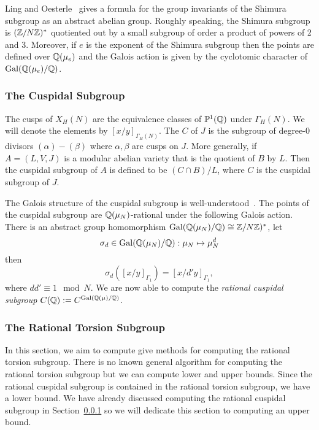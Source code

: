 \documentclass{article}
\begin{document}
Ling and Oesterle~\cite[Theorem 1,2]{MR1141458} gives a formula for the group
invariants of the Shimura subgroup as an abstract abelian group. Roughly
speaking, the Shimura subgroup is $(\mathbb{Z}/N\mathbb{Z})^*$ quotiented out by a small
subgroup of order a product of powers of 2 and 3. Moreover, if $e$ is the
exponent of the Shimura subgroup then the points are defined over $\mathbb{Q}(\mu_e)$
and the Galois action is given by the cyclotomic character of
$\operatorname{Gal}(\mathbb{Q}(\mu_e)/\mathbb{Q})$.


\subsubsection{The Cuspidal Subgroup}
\label{sec:cuspidal_subgroup}

The cusps of $X_H(N)$ are the equivalence classes of $\mathbb{P}^1(\mathbb{Q})$ under
$\Gamma_H(N)$. We will denote the elements by $[x/y]_{\Gamma_H(N)}$. The
 $C$ of $J$ is the subgroup of degree-0 divisors
$(\alpha)-(\beta)$ where $\alpha, \beta$ are cusps on $J$. More generally, if
$A=(L, V, J)$ is a modular abelian variety that is the quotient of $B$ by $L$.
Then the cuspidal subgroup of $A$ is defined to be $(C\cap B)/L$, where $C$ is
the cuspidal subgroup of $J$.

The Galois structure of the cuspidal subgroup is well-understood~\cite[\S
1.3]{MR670070}. The points of the cuspidal subgroup are $\mathbb{Q}(\mu_N)$-rational
under the following Galois action. There is an abstract group homomorphism
$\operatorname{Gal}(\mathbb{Q}(\mu_N)/\mathbb{Q})\cong \mathbb{Z}/N\mathbb{Z})^*$, let
\[
    \sigma_d\in \operatorname{Gal}(\mathbb{Q}(\mu_N)/\mathbb{Q}):\mu_N\mapsto \mu_N ^d
\]
then
\[
    \sigma_d([x/y]_{\Gamma_1})=[x/d'y]_{\Gamma_1},
\]
where $dd'\equiv 1 \mod{N}$. We are now able to compute the
\emph{rational cuspidal subgroup} $C(\mathbb{Q}):=C^{\operatorname{Gal}(\mathbb{Q}(\mu)/\mathbb{Q})}$.

\subsubsection{The Rational Torsion Subgroup}

In this section, we aim to compute give methods for computing the rational
torsion subgroup. There is no known general algorithm for computing the
rational torsion subgroup but we can compute lower and upper bounds.
Since the rational cuspidal subgroup is contained in the rational torsion
subgroup, we have a lower bound. We have already discussed computing the
rational cuspidal subgroup in Section~\ref{sec:cuspidal_subgroup} so we will
dedicate this section to computing an upper bound.
\end{document}
